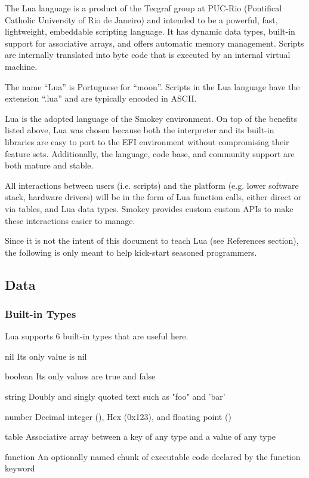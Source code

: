 \documentclass[11pt]{article}
\newcommand{\keyword}[1]{\mbox{\ttfamily#1}}
\begin{document}
The Lua language is a product of the Tecgraf group at PUC-Rio (Pontifical
Catholic University of Rio de Janeiro) and intended to be a powerful, fast,
lightweight, embeddable scripting language.  It has dynamic data types,
built-in support for associative arrays, and offers automatic memory
management.  Scripts are internally translated into byte code that is executed
by an internal virtual machine.

The name ``Lua'' is Portuguese for ``moon''.  Scripts in the Lua language have the
extension ``.lua'' and are typically encoded in ASCII.

Lua is the adopted language of the Smokey environment.  On top of the benefits
listed above, Lua was chosen because both the interpreter and its built-in
libraries are easy to port to the EFI environment without compromising their
feature sets.  Additionally, the language, code base, and community support are
both mature and stable.

All interactions between users (i.e. scripts) and the platform (e.g. lower
software stack, hardware drivers) will be in the form of Lua function calls,
either direct or via tables, and Lua  data types.  Smokey provides custom
custom APIs to make these interactions easier to manage.

Since it is not the intent of this document to teach Lua (see References
section), the following is only meant to help kick-start seasoned programmers.

\subsection{Data}

\subsubsection{Built-in Types}

Lua supports 6 built-in types that are useful here.

\begin{Definition}

\item[nil] Its only value is \keyword{nil}

\item[boolean] Its only values are \keyword{true} and \keyword{false}

\item[string] Doubly and singly quoted text such as \keyword{"foo"} and \keyword{'bar'}

\item[number] Decimal integer (\keyword{123}), Hex (\keyword{0x123}), and floating point (\keyword{10.5})

\item[table] Associative array between a key of any type and a value of any
	type

\item[function] An optionally named chunk of executable code declared by the
	\keyword{function} keyword

\end{Definition}
\end{document}
